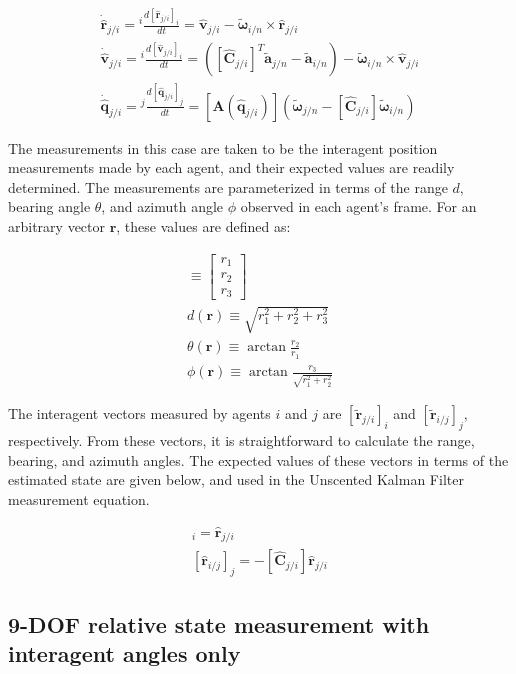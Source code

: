 \documentclass{aiaa-tc}
\newcommand{\br}[2]{[#1]_{#2}} %
\newcommand{\tvect}[3]{\begin{bmatrix}#1\\#2\\#3\end{bmatrix}}%
\newcommand{\B}[1]{\textbf{#1}} %
\newcommand{\BG}[1]{{\bm #1}}           %
\newcommand{\ddt}[1]{\frac{d#1}{dt}} %
\begin{document}
\begin{align}
\dot{\hat{\B{r}}}_{j/i} = {}^i \ddt{\br{\hat{\B{r}}_{j/i}}{i}} = \hat{\B{v}}_{j/i} - \tilde{\BG{\omega}}_{i/n} \times \hat{\B{r}}_{j/i}\\
\dot{\hat{\B{v}}}_{j/i} = {}^i \ddt{\br{\hat{\B{v}}_{j/i}}{i}} = ([\hat{\B{C}}_{j/i}]^T \tilde{\B{a}}_{j/n} - \tilde{\B{a}}_{i/n}) - \tilde{\BG{\omega}}_{i/n} \times \hat{\B{v}}_{j/i}\\
\dot{\hat{\B{q}}}_{j/i} = {}^j \ddt{\br{\hat{\B{q}}_{j/i}}{j}} = [\B{A}(\hat{\B{q}}_{j/i})](\tilde{\BG{\omega}}_{j/n}-[\hat{\B{C}}_{j/i}]\tilde{\BG{\omega}}_{i/n})
\end{align}

The measurements in this case are taken to be the interagent position measurements made by each agent, and their expected values are readily determined. The measurements are parameterized in terms of the range $d$, bearing angle $\theta$, and azimuth angle $\phi$ observed in each agent's frame. For an arbitrary vector $\B{r}$, these values are defined as:

\begin{align}
[\B{r}] \equiv \tvect{r_1}{r_2}{r_3}\\
d(\B{r}) \equiv \sqrt{r_1^2 + r_2^2 + r_3^2}\label{eq:rangeDef}\\
\theta(\B{r}) \equiv \arctan{ \frac{r_2}{r_1} }\label{eq:bearingDef}\\ 
\phi(\B{r}) \equiv \arctan{ \frac{r_3}{\sqrt{r_1^2+r_2^2}} }\label{eq:azimuthDef}
\end{align}

The interagent vectors measured by agents $i$ and $j$ are $\br{\tilde{\B{r}}_{j/i}}{i}$ and $\br{\tilde{\B{r}}_{i/j}}{j}$, respectively. From these vectors, it is straightforward to calculate the range, bearing, and azimuth angles. The expected values of these vectors in terms of the estimated state are given below, and used in the Unscented Kalman Filter measurement equation.

\begin{align}
\br{\hat{\B{r}}_{j/i}}{i} = \hat{\B{r}}_{j/i} \\
\br{\hat{\B{r}}_{i/j}}{j} = -[\hat{\B{C}}_{j/i}]\hat{\B{r}}_{j/i} 
\end{align}

\subsection{9-DOF relative state measurement with interagent angles only}
\end{document}
